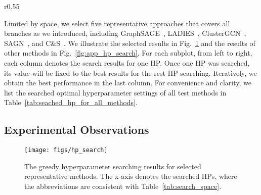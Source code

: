 \message{ !name(main.tex)}\documentclass{article}
\begin{document}
\begin{wraptable}{r}{0.55\linewidth}
{}
	\vspace{-4mm}
\end{wraptable}
Limited by space, we select five representative approaches that covers all branches as we introduced, including GraphSAGE~\cite{hamilton2017inductive}, LADIES~\cite{zou2019layer}, ClusterGCN~\cite{chiang2019cluster}, SAGN~\cite{sun2021scalable}, and C\&S~\cite{huang2020combining}. We illustrate the selected results in Fig.~\ref{fig:hp_search} and the results of other methods in Fig.~\ref{fig:app_hp_search}. For each subplot, from left to right, each column denotes the search results for one HP. Once one HP was searched, its value will be fixed to the best results for the rest HP searching. Iteratively, we obtain the best performance in the last column. For convenience and clarity, we list the searched optimal hyperparameter settings of all test methods in Table~\ref{tab:seached_hp_for_all_methods}.

\vspace{-2mm}
\subsection{Experimental Observations}
\begin{figure}[!ht]
	\vspace{-4mm}
	\begin{center}
		\texttt{[image: figs/hp\_search]}
	\end{center}
	\caption{The greedy hyperparameter searching results for selected representative methods. The x-axis denotes the searched HPs, where the abbreviations are consistent with Table~\ref{tab:search_space}.}
	\label{fig:hp_search}
\end{figure}
\end{document}
